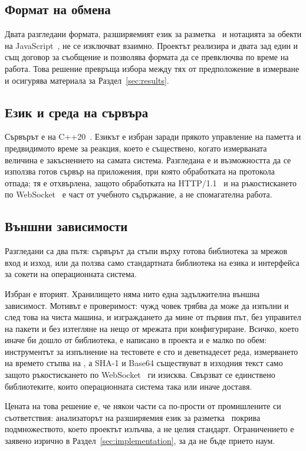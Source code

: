 \subsection{Формат на обмена}

Двата разгледани формата, разширяемият език за разметка~\cite{xml10} и нотацията за
обекти на JavaScript~\cite{rfc8259}, не се изключват взаимно. Проектът реализира и двата
зад един и същ договор за съобщение и позволява формата да се превключва по време на
работа. Това решение превръща избора между тях от предположение в измерване и осигурява
материала за Раздел~\ref{sec:results}.

\subsection{Език и среда на сървъра}

Сървърът е на C++20~\cite{iso_cpp20}. Езикът е избран заради прякото управление на паметта
и предвидимото време за реакция, което е съществено, когато измерваната величина е
закъснението на самата система. Разгледана е и възможността да се използва готов сървър на
приложения, при която обработката на протокола отпада; тя е отхвърлена, защото
обработката на HTTP/1.1~\cite{rfc9112} и на ръкостискането по WebSocket~\cite{rfc6455} е
част от учебното съдържание, а не спомагателна работа.

\subsection{Външни зависимости}

Разгледани са два пътя: сървърът да стъпи върху готова библиотека за мрежов вход и изход,
или да ползва само стандартната библиотека на езика и интерфейса за сокети на
операционната система.

Избран е вторият. Хранилището няма нито една задължителна външна зависимост. Мотивът е
проверимост: чужд човек трябва да може да изпълни  и след това
 на чиста машина, и изграждането да мине от първия път, без
управител на пакети и без изтегляне на нещо от мрежата при конфигуриране. Всичко, което
иначе би дошло от библиотека, е написано в проекта и е малко по обем: инструментът за
изпълнение на тестовете е сто и деветнадесет реда, измерването на времето стъпва на
, а SHA-1 и Base64 съществуват в изходния текст само
защото ръкостискането по WebSocket~\cite{rfc6455} ги изисква. Свързват се единствено
библиотеките, които операционната система така или иначе доставя.

Цената на това решение е, че някои части са по-прости от промишлените си съответствия:
анализаторът на разширяемия език за разметка~\cite{xml10} покрива подмножеството, което
проектът излъчва, а не целия стандарт. Ограничението е заявено изрично в
Раздел~\ref{sec:implementation}, за да не бъде прието наум.
